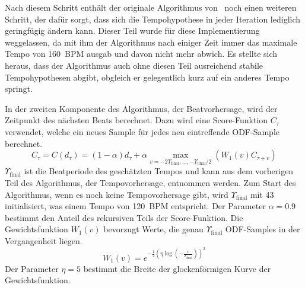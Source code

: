 {{{			%
			Nach diesem Schritt enthält der originale Algorithmus von~\cite{2009_DaPlSt} noch einen weiteren Schritt,
				der dafür sorgt,
				dass sich die Tempohypothese in jeder Iteration lediglich geringfügig ändern kann.
			Dieser Teil wurde für diese Implementierung weggelassen,
				da mit ihm der Algorithmus nach einiger Zeit immer das maximale Tempo von \SI{160}{\ac{BPM}} ausgab
				und davon nicht mehr abwich. 
			Es stellte sich heraus,
				dass der Algorithmus auch ohne diesen Teil ausreichend stabile Tempohypothesen abgibt,
				obgleich er gelegentlich kurz auf ein anderes Tempo springt.

			In der zweiten Komponente des Algorithmus,
				der Beatvorhersage,
				wird der Zeitpunkt des nächsten Beats berechnet.
			Dazu wird eine Score-Funktion $C_\tau$ verwendet,
				welche ein neues Sample für jedes neu eintreffende \ac{ODF}-Sample berechnet.
			\begin{equation}
				C_\tau = C(d_\tau) =
					(1 - \alpha)d_\tau +
					\alpha \max_{v = -2 \Upsilon_\text{final}, ..., -\Upsilon_\text{final} / 2}(W_1(v) C_{\tau + v})
				\label{eq:score_function}
			\end{equation}
			$\Upsilon_\text{final}$ ist die Beatperiode des geschätzten Tempos
				und kann aus dem vorherigen Teil des Algorithmus, der Tempovorhersage, entnommen werden.
			Zum Start des Algorithmus,
				wenn es noch keine Tempovorhersage gibt,
				wird $\Upsilon_\text{final}$ mit \num{43} initialisiert,
				was einem Tempo von \SI{120}{\ac{BPM}} entspricht.
			Der Parameter $\alpha = 0.9$ bestimmt den Anteil des rekursiven Teils der Score-Funktion.
			Die Gewichtsfunktion $W_1(v)$ bevorzugt Werte, die genau $\Upsilon_\text{final}$ \ac{ODF}-Samples in der Vergangenheit liegen.
			\begin{equation}
				W_1(v) = e^{-\frac{1}{2} \left( \eta \log \left( -\frac{v}{\Upsilon_\text{final}} \right) \right)^2}
			\end{equation}
			Der Parameter $\eta = 5$ bestimmt die Breite der glockenförmigen Kurve der Gewichtsfunktion.

}}}

